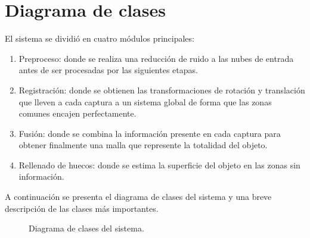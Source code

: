 \section{Diagrama de clases}
El sistema se dividió en cuatro módulos principales:
\begin{enumerate}
	\item Preproceso:
		donde se realiza una reducción de ruido a las nubes de entrada
		antes de ser procesadas por las siguientes etapas.
	\item Registración:
		donde se obtienen las transformaciones de rotación y translación
		que lleven a cada captura a un sistema global
		de forma que las zonas comunes encajen perfectamente.
	\item Fusión:
		donde se combina la información presente en cada captura
		para obtener finalmente una malla que represente la totalidad del objeto.
	\item Rellenado de huecos:
		donde se estima la superficie del objeto en las zonas sin información.
\end{enumerate}

A continuación se presenta el diagrama de clases del sistema y una breve descripción de las clases más importantes.

\begin{figure}[h]
	\caption[Diagrama de clases del sistema]{\label{fig:diagrama_de_clases}Diagrama de clases del sistema.}
\end{figure}

